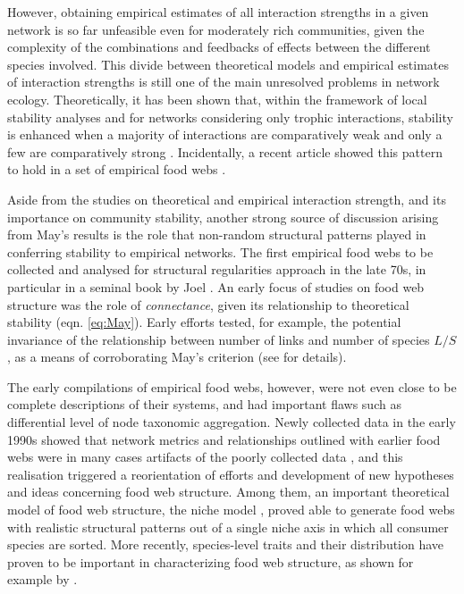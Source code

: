 However, obtaining empirical estimates of all interaction strengths in a given network is so far unfeasible even for moderately rich communities, given the complexity of the combinations and feedbacks of effects between the different species involved. This divide between theoretical models and empirical estimates of interaction strengths is still one of the main unresolved problems in network ecology. Theoretically, it has been shown that, within the framework of local stability analyses and for networks considering only trophic interactions, stability is enhanced when a majority of interactions are comparatively weak and only a few are comparatively strong \citep{McCann1998,Berlow1999}. Incidentally, a recent article showed this pattern to hold in a set of empirical food webs \citep{Jacquet2016}.

Aside from the studies on theoretical and empirical interaction strength, and its importance on community stability, another strong source of discussion arising from May's results is the role that non-random structural patterns played in conferring stability to empirical networks. The first empirical food webs to be collected and analysed for structural regularities approach in the late 70s, in particular in a seminal book by Joel \cite{Cohen1978}. An early focus of studies on food web structure was the role of \textit{connectance}, given its relationship to theoretical stability (eqn. \ref{eq:May}). Early efforts tested, for example, the potential invariance of the relationship between number of links and number of species $L/S$, as a means of corroborating May's criterion (see \citealt{Pascual2006} for details).

The early compilations of empirical food webs, however, were not even close to be complete descriptions of their systems, and had important flaws such as differential level of node taxonomic aggregation. Newly collected data in the early 1990s \citep{Polis1991, Martinez1991} showed that network metrics and relationships outlined with earlier food webs were in many cases artifacts of the poorly collected data \citep{Pascual2006}, and this realisation triggered a reorientation of efforts and development of new hypotheses and ideas concerning food web structure. Among them, an important theoretical model of food web structure, the niche model \citep{Williams2000}, proved able to generate food webs with realistic structural patterns out of a single niche axis in which all consumer species are sorted. More recently, species-level traits and their distribution have proven to be important in characterizing food web structure, as shown for example by \cite{Laigle2018}.

